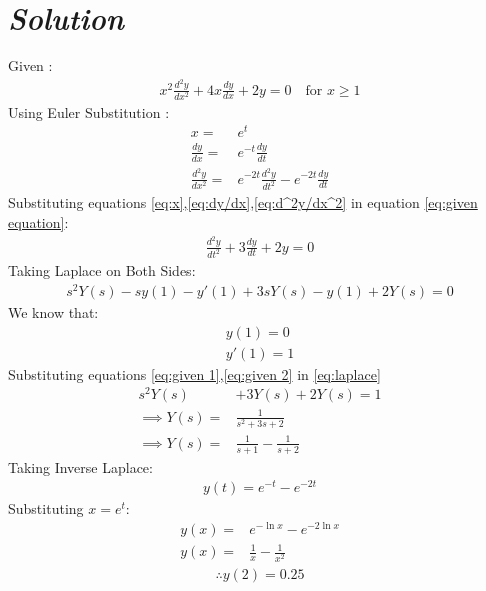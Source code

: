 \documentclass[journal,12pt,twocolumn]{IEEEtran}
\theoremstyle{remark}
\begin{document}
\section*{\textit{\textbf{Solution}}}
\noindent Given : 
\begin{align}
x^2\frac{d^2y}{dx^2} + 4x\frac{dy}{dx} + 2y = 0 \quad \text{for } x\geq 1 \label{eq:given equation}
\end{align}
Using Euler Substitution : 
\begin{align}
x= & e^t \label{eq:x}\\
\frac{dy}{dx}= & e^{-t}\frac{dy}{dt}\label{eq:dy/dx}\\
\frac{d^2y}{dx^2} = & e^{-2t}\frac{d^2y}{dt^2} - e^{-2t}\frac{dy}{dt}\label{eq:d^2y/dx^2}
\end{align}
Substituting equations \eqref{eq:x},\eqref{eq:dy/dx},\eqref{eq:d^2y/dx^2} in equation \eqref{eq:given equation}:
\begin{align}
\frac{d^2y}{dt^2} + 3\frac{dy}{dt} + 2y = 0
\end{align}
Taking Laplace on Both Sides:
\begin{align}
s^2 Y(s) - sy(1)-y'(1) + 3{sY(s) - y(1)} + 2Y(s)= 0\label{eq:laplace}
\end{align}
We know that:
\begin{align}
y(1)=0\label{eq:given 1}\\
y'(1)=1\label{eq:given 2}
\end{align}
Substituting equations \eqref{eq:given 1},\eqref{eq:given 2} in \eqref{eq:laplace}
\begin{align}
s^2Y(s)& + 3Y(s) +2Y(s)= 1\\
\implies Y(s)=&\frac{1}{s^2 + 3s + 2 }\\
\implies Y(s)=&\frac{1}{s+1} - \frac{1}{s+2}
\end{align}
Taking Inverse Laplace:
\begin{align}
y(t) = e^{-t} - e^{-2t}
\end{align}
Substituting $x=e^t$:
\begin{align}
y(x)=& e^{-\ln{x}} - e^{-2\ln{x}}\\
y(x)=& \frac{1}{x} - \frac{1}{x^2}
\end{align}
\begin{align}
    \therefore y(2) = 0.25
\end{align}
\end{document}
